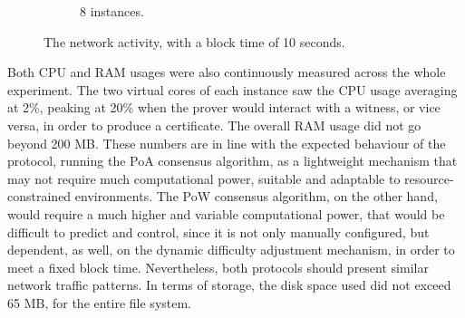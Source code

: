 \begin{figure} [h!]
\begin{subfigure}[b]{\textwidth}
        \caption{8 instances.}
        \label{fig:blockchain-blocks-generation-8-instances}
    \end{subfigure}
    \caption{The network activity, with a block time of 10 seconds.}
    \label{fig:blockchain-blocks-generation}
\end{figure}

Both CPU and RAM usages were also continuously measured across the whole experiment. The two virtual cores of each instance saw the CPU usage averaging at 2\%, peaking at 20\% when the prover would interact with a witness, or vice versa, in order to produce a \pol{} certificate. The overall RAM usage did not go beyond 200 MB. These numbers are in line with the expected behaviour of the protocol, running the PoA consensus algorithm, as a lightweight mechanism that may not require much computational power, suitable and adaptable to resource-constrained environments. The PoW consensus algorithm, on the other hand, would require a much higher and variable computational power, that would be difficult to predict and control, since it is not only manually configured, but dependent, as well, on the dynamic difficulty adjustment mechanism, in order to meet a fixed block time. Nevertheless, both protocols should present similar network traffic patterns. In terms of storage, the disk space used did not exceed 65 MB, for the entire file system.

